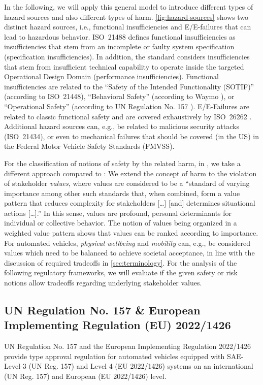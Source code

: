 In the following, we will apply this general model to introduce different types of hazard sources and also different types of harm.
\cref{fig:hazard-sources} shows two distinct hazard sources, i.e., functional insufficiencies and E/E-failures that can lead to hazardous behavior.
ISO~21488 \parencite{iso21448} defines functional insufficiencies as insufficiencies that stem from an incomplete or faulty system specification (specification insufficiencies).
In addition, the standard considers insufficiencies that stem from insufficient technical capability to operate inside the targeted Operational Design Domain (performance insufficiencies).
Functional insufficiencies are related to the ``Safety of the Intended Functionality (SOTIF)'' (according to ISO~21448), ``Behavioral Safety'' (according to Waymo \parencite{waymo2018}), or ``Operational Safety'' (according to UN Regulation No. 157 \parencite{un157}).
E/E-Failures are related to classic functional safety and are covered exhaustively by ISO~26262 \parencite{iso2018}.
Additional hazard sources can, e.g., be related to malicious security attacks (ISO~21434), or even to mechanical failures that should be covered (in the US) in the Federal Motor Vehicle Safety Standards (FMVSS).

For the classification of notions of safety by the related harm, in \parencite{salem2024, nolte2024}, we take a different approach compared to \parencite{koopman2024}:
We extend the concept of harm to the violation of stakeholder \emph{values}, where values are considered to be a ``standard of varying importance among other such standards that, when combined, form a value pattern that reduces complexity for stakeholders [\ldots] [and] determines situational actions [\ldots].'' \parencite{albert2008}
In this sense, values are profound, personal determinants for individual or collective behavior.
The notion of values being organized in a weighted value pattern shows that values can be ranked according to importance.
For automated vehicles, \emph{physical wellbeing} and \emph{mobility} can, e.g., be considered values which need to be balanced to achieve societal acceptance, in line with the discussion of required tradeoffs in \cref{sec:terminology}.
For the analysis of the following regulatory frameworks, we will evaluate if the given safety or risk notions allow tradeoffs regarding underlying stakeholder values. 

\subsection{UN Regulation No. 157 \& European Implementing Regulation (EU) 2022/1426}
\label{sec:enabling-act}
UN Regulation No. 157 \parencite{un157} and the European Implementing Regulation 2022/1426 \parencite{eu1426} provide type approval regulation for automated vehicles equipped with SAE-Level-3 (UN Reg. 157) and Level 4 (EU 2022/1426) systems on an international (UN Reg. 157) and European (EU 2022/1426) level.

